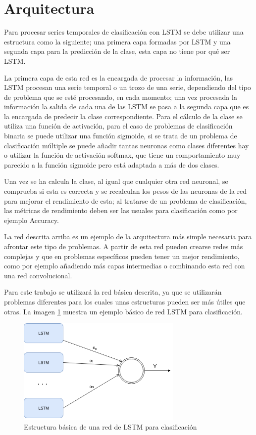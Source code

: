 \section{Arquitectura}
Para procesar series temporales de clasificación con LSTM se debe utilizar una estructura como la siguiente; una primera capa formadas por LSTM y una segunda capa para la predicción de la clase, esta capa no tiene por qué ser LSTM.\newline

La primera capa de esta red es la encargada de procesar la información, las LSTM procesan una serie temporal o un trozo de una serie, dependiendo del tipo de problema que se esté procesando, en cada momento; una vez procesada la información la salida de cada una de las LSTM se pasa a la segunda capa que es la encargada de predecir la clase correspondiente. Para el cálculo de la clase se utiliza una función de activación, para el caso de problemas de clasificación binaria se puede utilizar una función sigmoide, si se trata de un problema de clasificación múltiple se puede añadir tantas neuronas como clases diferentes hay o utilizar la función de activación softmax, que tiene un comportamiento muy parecido a la función sigmoide pero está adaptada a más de dos clases.\newline

Una vez se ha calcula la clase, al igual que cualquier otra red neuronal,  se comprueba si esta es correcta y se recalculan los pesos de las neuronas de la red para mejorar el rendimiento de esta; al tratarse de un problema de clasificación, las métricas de rendimiento deben ser las usuales para clasificación como por ejemplo Accuracy.\newline

La red descrita arriba es un ejemplo de la arquitectura más simple necesaria para afrontar este tipo de problemas. A partir de esta red pueden crearse redes más complejas y que en problemas específicos pueden tener un mejor rendimiento, como por ejemplo añadiendo más capas intermedias o combinando esta red con una red convolucional.\newline

Para este trabajo se utilizará la red básica descrita, ya que se utilizarán problemas diferentes para los cuales unas estructuras pueden ser más útiles que otras. La imagen \ref{fig:32} muestra un ejemplo básico de red LSTM para clasificación.

\begin{figure}[H]
	\centering
	\includegraphics[width=80mm]{imagenes/arquitectura_base.png}
	\caption{Estructura básica de una red de LSTM para clasificación}
	\label{fig:32}
\end{figure}
\verticalspace


